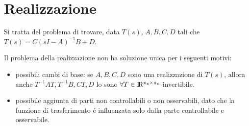 \documentclass[../main.tex]{subfiles}
\begin{document}
	\section{Realizzazione}
		Si tratta del problema di trovare, data $ T(s) $, $ A, B, C, D $ tali che $ T(s) = C(sI-A)^{-1}B + D $.
		
		Il problema della realizzazione non ha soluzione unica per i seguenti motivi:
		\begin{itemize}
			\item 
				possibili cambi di base: se $ A, B, C, D $ sono una realizzazione di $ T(s) $, allora anche $ T^{-1}AT, T^{-1}B, CT, D $ lo sono $ \forall T \in \rm I\!R^{n_x \times n_x} $ invertibile.
			\item 
				possibile aggiunta di parti non controllabili o non osservabili, dato che la funzione di trasferimento \'e influenzata solo dalla parte controllabile e osservabile.
		\end{itemize}
	
\end{document}
